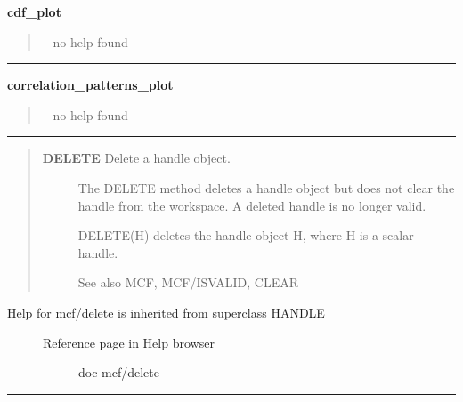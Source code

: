 \documentclass[letterpaper,10pt,english]{sphinxmanual}
\begin{document}
\label{classes/utils/@mcf/mcf:cdf-plot}
\textbf{cdf\_plot}
\begin{quote}

-- no help found
\end{quote}


\bigskip\hrule{}\bigskip

\label{classes/utils/@mcf/mcf:correlation-patterns-plot}
\textbf{correlation\_patterns\_plot}
\begin{quote}

-- no help found
\end{quote}


\bigskip\hrule{}\bigskip

\label{classes/utils/@mcf/mcf:delete}\begin{quote}
\begin{description}
\item[{\textbf{DELETE}   Delete a handle object.}] \leavevmode
The DELETE method deletes a handle object but does not clear the handle
from the workspace.  A deleted handle is no longer valid.

DELETE(H) deletes the handle object H, where H is a scalar handle.

See also MCF, MCF/ISVALID, CLEAR

\end{description}
\end{quote}
\begin{description}
\item[{Help for mcf/delete is inherited from superclass HANDLE}] \leavevmode\begin{description}
\item[{Reference page in Help browser}] \leavevmode
doc mcf/delete

\end{description}

\end{description}


\bigskip\hrule{}\bigskip
\end{document}
